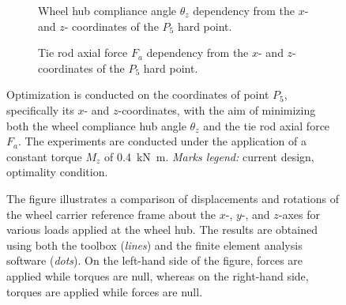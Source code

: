 \begin{figure}[!ht]
  \centering
    \begin{subfigure}[t]{0.49\textwidth}
    \small{}
    \caption{Wheel hub compliance angle $\theta_z$ dependency from the $x$- and $z$- coordinates of the $P_5$ hard point.}
    \label{chap5:fig:variation_theta_z}
  \end{subfigure}
  \hfill
  \begin{subfigure}[t]{0.49\textwidth}
    \centering
    \small{}
    \caption{Tie rod axial force $F_a$ dependency from the $x$- and $z$- coordinates of the $P_5$ hard point.}
    \label{chap5:fig:variation_force_tie}
  \end{subfigure}
  \caption{Optimization is conducted on the coordinates of point $P_5$, specifically its $x$- and $z$-coordinates, with the aim of minimizing both the wheel compliance hub angle $\theta_z$ and the tie rod axial force $F_a$. The experiments are conducted under the application of a constant torque $M_z$ of \SI{0.4}{\kilo\newton\meter}. \emph{Marks legend:} {\color{mycolor2}\raisebox{-.15pt}{\Large$\bullet$}} current design, {\color{mycolor5}\raisebox{-.15pt}{\Large$\bullet$}} optimality condition.}
  \label{chap5:fig:optimization}
\end{figure}

\begin{figure}[htp!]
  \centering
  \small{}
  \caption{The figure illustrates a comparison of displacements and rotations of the wheel carrier reference frame about the $x$-, $y$-, and $z$-axes for various loads applied at the wheel hub. The results are obtained using both the \TrussMe{} toolbox (\emph{lines}) and the \Ansys{} finite element analysis software (\emph{dots}). On the left-hand side of the figure, forces are applied while torques are null, whereas on the right-hand side, torques are applied while forces are null.}
  \label{chap5:fig:suspension_static_results}
\end{figure}

